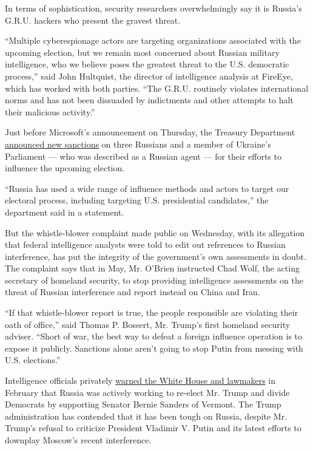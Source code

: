 In terms of sophistication, security researchers overwhelmingly say it
is Russia's G.R.U. hackers who present the gravest threat.

``Multiple cyberespionage actors are targeting organizations associated
with the upcoming election, but we remain most concerned about Russian
military intelligence, who we believe poses the greatest threat to the
U.S. democratic process,'' said John Hultquist, the director of
intelligence analysis at FireEye, which has worked with both parties.
``The G.R.U. routinely violates international norms and has not been
dissuaded by indictments and other attempts to halt their malicious
activity.''

Just before Microsoft's announcement on Thursday, the Treasury
Department
\href{https://www.nytimes3xbfgragh.onion/2020/09/10/us/politics/sanctions-russia-ukraine-election-interference.html}{announced
new sanctions} on three Russians and a member of Ukraine's Parliament
--- who was described as a Russian agent --- for their efforts to
influence the upcoming election.

``Russia has used a wide range of influence methods and actors to target
our electoral process, including targeting U.S. presidential
candidates,'' the department said in a statement.

But the whistle-blower complaint made public on Wednesday, with its
allegation that federal intelligence analysts were told to edit out
references to Russian interference, has put the integrity of the
government's own assessments in doubt. The complaint says that in May,
Mr. O'Brien instructed Chad Wolf, the acting secretary of homeland
security, to stop providing intelligence assessments on the threat of
Russian interference and report instead on China and Iran.

``If that whistle-blower report is true, the people responsible are
violating their oath of office,'' said Thomas P. Bossert, Mr. Trump's
first homeland security adviser. ``Short of war, the best way to defeat
a foreign influence operation is to expose it publicly. Sanctions alone
aren't going to stop Putin from messing with U.S. elections.''

Intelligence officials privately
\href{https://www.nytimes3xbfgragh.onion/2020/02/20/us/politics/russian-interference-trump-democrats.html?searchResultPosition=1}{warned
the White House and lawmakers} in February that Russia was actively
working to re-elect Mr. Trump and divide Democrats by supporting Senator
Bernie Sanders of Vermont. The Trump administration has contended that
it has been tough on Russia, despite Mr. Trump's refusal to criticize
President Vladimir V. Putin and its latest efforts to downplay Moscow's
recent interference.

